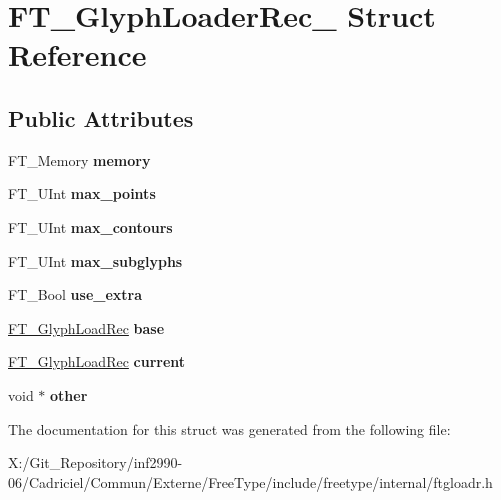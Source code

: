 \hypertarget{struct_f_t___glyph_loader_rec__}{\section{F\-T\-\_\-\-Glyph\-Loader\-Rec\-\_\- Struct Reference}
\label{struct_f_t___glyph_loader_rec__}
}
\subsection*{Public Attributes}
\begin{DoxyCompactItemize}
\item 
\hypertarget{struct_f_t___glyph_loader_rec___a9120a7808ee59d24dd52409e609907a2}{F\-T\-\_\-\-Memory {\bfseries memory}}\label{struct_f_t___glyph_loader_rec___a9120a7808ee59d24dd52409e609907a2}

\item 
\hypertarget{struct_f_t___glyph_loader_rec___a62339fa7a06e0b4ddecd5db2aa606741}{F\-T\-\_\-\-U\-Int {\bfseries max\-\_\-points}}\label{struct_f_t___glyph_loader_rec___a62339fa7a06e0b4ddecd5db2aa606741}

\item 
\hypertarget{struct_f_t___glyph_loader_rec___a808ccf46597572d953f387e705f10a36}{F\-T\-\_\-\-U\-Int {\bfseries max\-\_\-contours}}\label{struct_f_t___glyph_loader_rec___a808ccf46597572d953f387e705f10a36}

\item 
\hypertarget{struct_f_t___glyph_loader_rec___a2d5b00d7caf624ed2b4f6fd2db3228db}{F\-T\-\_\-\-U\-Int {\bfseries max\-\_\-subglyphs}}\label{struct_f_t___glyph_loader_rec___a2d5b00d7caf624ed2b4f6fd2db3228db}

\item 
\hypertarget{struct_f_t___glyph_loader_rec___a54009985acda32d83f2f124e28c5d00a}{F\-T\-\_\-\-Bool {\bfseries use\-\_\-extra}}\label{struct_f_t___glyph_loader_rec___a54009985acda32d83f2f124e28c5d00a}

\item 
\hypertarget{struct_f_t___glyph_loader_rec___ae80dfc17f20bfce8c60ffaaba95c821b}{\hyperlink{struct_f_t___glyph_load_rec__}{F\-T\-\_\-\-Glyph\-Load\-Rec} {\bfseries base}}\label{struct_f_t___glyph_loader_rec___ae80dfc17f20bfce8c60ffaaba95c821b}

\item 
\hypertarget{struct_f_t___glyph_loader_rec___a271b1b9604746ed08cf6613710ebb4c1}{\hyperlink{struct_f_t___glyph_load_rec__}{F\-T\-\_\-\-Glyph\-Load\-Rec} {\bfseries current}}\label{struct_f_t___glyph_loader_rec___a271b1b9604746ed08cf6613710ebb4c1}

\item 
\hypertarget{struct_f_t___glyph_loader_rec___a9c58c5b06f0135fe5cef16bd85d939e3}{void $\ast$ {\bfseries other}}\label{struct_f_t___glyph_loader_rec___a9c58c5b06f0135fe5cef16bd85d939e3}

\end{DoxyCompactItemize}


The documentation for this struct was generated from the following file\-:\begin{DoxyCompactItemize}
\item 
X\-:/\-Git\-\_\-\-Repository/inf2990-\/06/\-Cadriciel/\-Commun/\-Externe/\-Free\-Type/include/freetype/internal/ftgloadr.\-h\end{DoxyCompactItemize}
